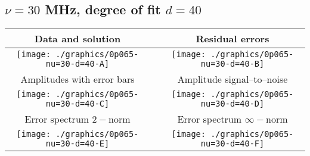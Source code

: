 

% 

\clearpage{}
\break{}

\subsection{$\nu = 30$ MHz, degree of fit $d = 40$}

\begin{table}[h]
    \begin{center}
        \begin{tabular}{ccc}
            Data and solution & \quad & Residual errors \\\hline
            \texttt{[image: ./graphics/0p065-nu=30-d=40-A]} &&
            \texttt{[image: ./graphics/0p065-nu=30-d=40-B]} \\[15pt]
            Amplitudes with error bars && Amplitude signal--to--noise \\\hline
            \texttt{[image: ./graphics/0p065-nu=30-d=40-C]} &&
            \texttt{[image: ./graphics/0p065-nu=30-d=40-D]} \\[15pt]
            Error spectrum $2-$norm && Error spectrum $\infty-$norm \\\hline
            \texttt{[image: ./graphics/0p065-nu=30-d=40-E]} &&
            \texttt{[image: ./graphics/0p065-nu=30-d=40-F]} \\[15pt]
        \end{tabular}
    \end{center}
\label{fig:elev=65, nu=30}
\end{table}



\endinput
